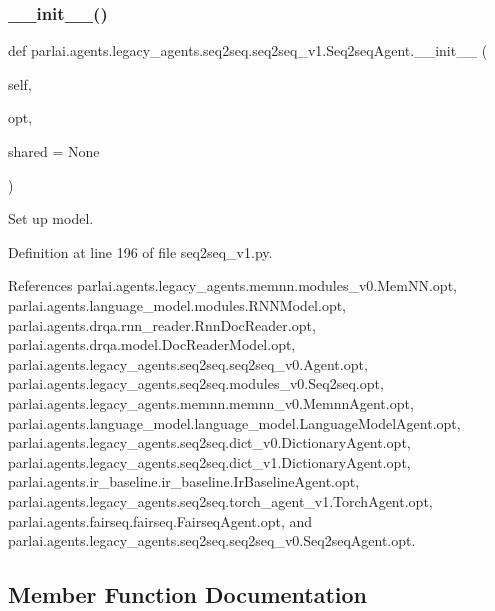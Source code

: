 \subsubsection{\texorpdfstring{\+\_\+\+\_\+init\+\_\+\+\_\+()}{\_\_init\_\_()}}
{\footnotesize\ttfamily def parlai.\+agents.\+legacy\+\_\+agents.\+seq2seq.\+seq2seq\+\_\+v1.\+Seq2seq\+Agent.\+\_\+\+\_\+init\+\_\+\+\_\+ (\begin{DoxyParamCaption}\item[{}]{self,  }\item[{}]{opt,  }\item[{}]{shared = {\ttfamily None} }\end{DoxyParamCaption})}

\begin{DoxyVerb}Set up model.\end{DoxyVerb}
 

Definition at line 196 of file seq2seq\+\_\+v1.\+py.



References parlai.\+agents.\+legacy\+\_\+agents.\+memnn.\+modules\+\_\+v0.\+Mem\+N\+N.\+opt, parlai.\+agents.\+language\+\_\+model.\+modules.\+R\+N\+N\+Model.\+opt, parlai.\+agents.\+drqa.\+rnn\+\_\+reader.\+Rnn\+Doc\+Reader.\+opt, parlai.\+agents.\+drqa.\+model.\+Doc\+Reader\+Model.\+opt, parlai.\+agents.\+legacy\+\_\+agents.\+seq2seq.\+seq2seq\+\_\+v0.\+Agent.\+opt, parlai.\+agents.\+legacy\+\_\+agents.\+seq2seq.\+modules\+\_\+v0.\+Seq2seq.\+opt, parlai.\+agents.\+legacy\+\_\+agents.\+memnn.\+memnn\+\_\+v0.\+Memnn\+Agent.\+opt, parlai.\+agents.\+language\+\_\+model.\+language\+\_\+model.\+Language\+Model\+Agent.\+opt, parlai.\+agents.\+legacy\+\_\+agents.\+seq2seq.\+dict\+\_\+v0.\+Dictionary\+Agent.\+opt, parlai.\+agents.\+legacy\+\_\+agents.\+seq2seq.\+dict\+\_\+v1.\+Dictionary\+Agent.\+opt, parlai.\+agents.\+ir\+\_\+baseline.\+ir\+\_\+baseline.\+Ir\+Baseline\+Agent.\+opt, parlai.\+agents.\+legacy\+\_\+agents.\+seq2seq.\+torch\+\_\+agent\+\_\+v1.\+Torch\+Agent.\+opt, parlai.\+agents.\+fairseq.\+fairseq.\+Fairseq\+Agent.\+opt, and parlai.\+agents.\+legacy\+\_\+agents.\+seq2seq.\+seq2seq\+\_\+v0.\+Seq2seq\+Agent.\+opt.



\subsection{Member Function Documentation}
\mbox{\label{classparlai_1_1agents_1_1legacy__agents_1_1seq2seq_1_1seq2seq__v1_1_1Seq2seqAgent_a2f5c66732d78976428b26b96f14b311b}} 
